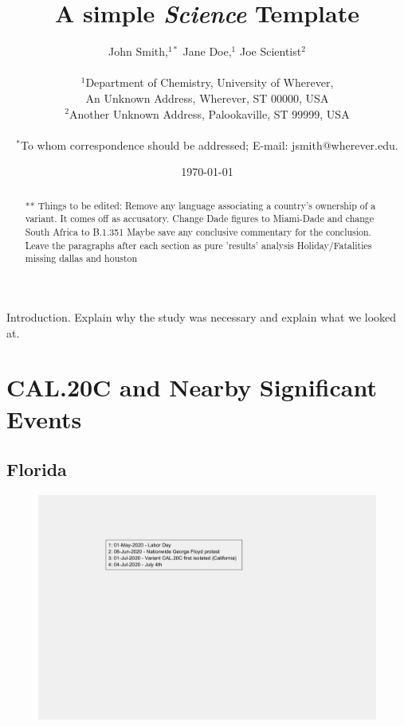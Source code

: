 \documentclass[]{article}
\title{A simple {\it Science\/} Template}
\author
{John Smith,$^{1\ast}$ Jane Doe,$^{1}$ Joe Scientist$^{2}$\\
	\\
	\normalsize{$^{1}$Department of Chemistry, University of Wherever,}\\
	\normalsize{An Unknown Address, Wherever, ST 00000, USA}\\
	\normalsize{$^{2}$Another Unknown Address, Palookaville, ST 99999, USA}\\
	\\
	\normalsize{$^\ast$To whom correspondence should be addressed; E-mail:  jsmith@wherever.edu.}
}
\date{\today}
\begin{document}
	
\baselineskip24pt

\maketitle

\begin{abstract}
 ** Things to be edited:
 Remove any language associating a country's ownership of a variant. It comes off as accusatory. 
 Change Dade figures to Miami-Dade and change South Africa to B.1.351
  Maybe save any conclusive commentary for the conclusion. Leave the paragraphs after each section as pure 'results' analysis
  Holiday/Fatalities missing dallas and houston
 
\end{abstract}

\indent Introduction. Explain why the study was necessary and explain what we looked at. 


\section{CAL.20C and Nearby Significant Events}

\subsection{Florida}

\begin{figure}[!h]
	\includegraphics[width=\linewidth]{legends/CAL20C_legend.png}
	\caption{}
	\label{fig:legends/CAL20C_legendLabel}
\end{figure}
\end{document}
